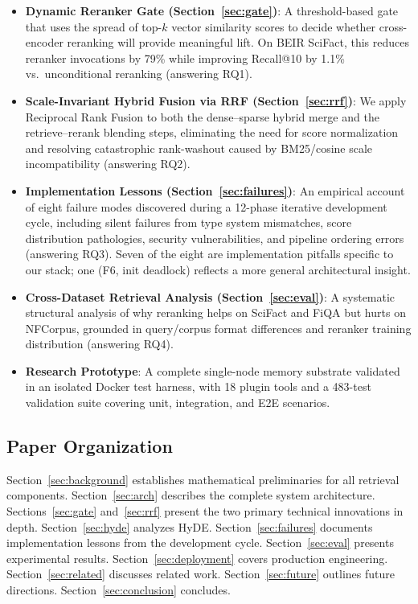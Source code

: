 \documentclass[11pt]{article}
\begin{document}
\begin{itemize}[leftmargin=1.5em, itemsep=3pt]
  \item \textbf{Dynamic Reranker Gate (Section~\ref{sec:gate})}: A threshold-based gate
  that uses the spread of top-$k$ vector similarity scores to decide whether
  cross-encoder reranking will provide meaningful lift. On BEIR SciFact, this reduces
  reranker invocations by 79\% while improving Recall@10 by 1.1\% vs.\ unconditional
  reranking (answering RQ1).

  \item \textbf{Scale-Invariant Hybrid Fusion via RRF (Section~\ref{sec:rrf})}: We apply
  Reciprocal Rank Fusion \citep{cormack2009reciprocal} to both the dense--sparse hybrid
  merge and the retrieve--rerank blending steps, eliminating the need for score
  normalization and resolving catastrophic rank-washout caused by BM25/cosine scale
  incompatibility (answering RQ2).

  \item \textbf{Implementation Lessons (Section~\ref{sec:failures})}: An
  empirical account of eight failure modes discovered during a 12-phase iterative
  development cycle, including silent failures from type system mismatches, score
  distribution pathologies, security vulnerabilities, and pipeline ordering errors
  (answering RQ3). Seven of the eight are implementation pitfalls specific to our
  stack; one (F6, init deadlock) reflects a more general architectural insight.

  \item \textbf{Cross-Dataset Retrieval Analysis (Section~\ref{sec:eval})}: A systematic
  structural analysis of why reranking helps on SciFact and FiQA but hurts on NFCorpus,
  grounded in query/corpus format differences and reranker training distribution
  (answering RQ4).

  \item \textbf{Research Prototype}: A complete single-node memory substrate validated in an
  isolated Docker test harness, with 18 plugin tools and a 483-test validation
  suite covering unit, integration, and E2E scenarios.
\end{itemize}

\subsection{Paper Organization}

Section~\ref{sec:background} establishes mathematical preliminaries for all retrieval
components. Section~\ref{sec:arch} describes the complete system architecture.
Sections~\ref{sec:gate} and~\ref{sec:rrf} present the two primary technical
innovations in depth. Section~\ref{sec:hyde} analyzes HyDE. Section~\ref{sec:failures}
documents implementation lessons from the development cycle. Section~\ref{sec:eval} presents experimental results.
Section~\ref{sec:deployment} covers production engineering. Section~\ref{sec:related}
discusses related work. Section~\ref{sec:future} outlines future directions.
Section~\ref{sec:conclusion} concludes.
\end{document}
